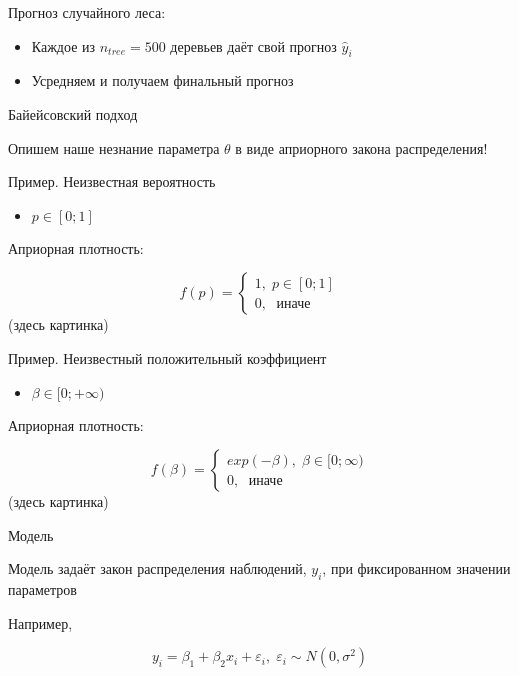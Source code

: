 \documentclass[ignorenonframetext,]{beamer}
\newcommand{\e}{\varepsilon}
\newcommand{\hy}{\hat{y}}
\begin{document}
\begin{frame}{Прогноз случайного леса:}

\begin{itemize}
\item
  Каждое из \(n_{tree}=500\) деревьев даёт свой прогноз \(\hy_i\)
\item
  Усредняем и получаем финальный прогноз
\end{itemize}

\end{frame}

\begin{frame}{Байейсовский подход}

Опишем наше незнание параметра \(\theta\) в виде априорного закона
распределения!

\end{frame}

\begin{frame}{Пример. Неизвестная вероятность}

\begin{itemize}
\itemsep1pt\parskip0pt
\item
  \(p \in [0;1]\)
\end{itemize}

Априорная плотность:

\[
f(p)=\begin{cases}
1, \; p\in[0;1] \\
0, \; \text{ иначе }
\end{cases}
\] (здесь картинка)

\end{frame}

\begin{frame}{Пример. Неизвестный положительный коэффициент}

\begin{itemize}
\itemsep1pt\parskip0pt
\item
  \(\beta \in [0;+\infty)\)
\end{itemize}

Априорная плотность:

\[
f(\beta)=\begin{cases}
exp(-\beta), \; \beta \in[0;\infty) \\
0, \; \text{ иначе }
\end{cases}
\] (здесь картинка)

\end{frame}

\begin{frame}{Модель}

Модель задаёт закон распределения наблюдений, \(y_i\), при фиксированном
значении параметров

Например,

\[
y_i = \beta_1 + \beta_2 x_i + \e_i, \; \e_i \sim N(0,\sigma^2)
\]

\end{frame}
\end{document}
